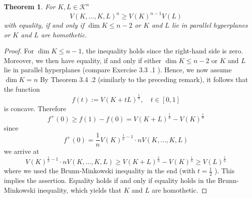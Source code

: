 \documentclass[oneside]{book}
\newtheorem{theorem}{Theorem}[section]
\begin{document}
 
\begin{theorem}
 
For $K, L \in \mathcal{K}^{n}$
\[
V(K, \ldots, K, L)^{n} \geq V(K)^{n-1} V(L)
\]
with equality, if and only if $\operatorname{dim} K \leq n-2$ or $K$ and $L$ lie in parallel hyperplanes or $K$ and $L$ are homothetic.
\end{theorem} 
\begin{proof}
    

 For $\operatorname{dim} K \leq n-1$, the inequality holds since the right-hand side is zero. Moreover, we then have equality, if and only if either $\operatorname{dim} K \leq n-2$ or $K$ and $L$ lie in parallel hyperplanes (compare Exercise 3.3 .1 ). Hence, we now assume $\operatorname{dim} K=n$ By Theorem 3.4 .2 (similarly to the preceding remark), it follows that the function
\[
f(t):=V(K+t L)^{\frac{1}{n}}, \quad t \in[0,1]
\]
is concave. Therefore
\[
f^{+}(0) \geq f(1)-f(0)=V(K+L)^{\frac{1}{n}}-V(K)^{\frac{1}{n}}
\]
since
\[
f^{+}(0)=\frac{1}{n} V(K)^{\frac{1}{n}-1} \cdot n V(K, \ldots, K, L)
\]
we arrive at
\[
V(K)^{\frac{1}{n}-1} \cdot n V(K, \ldots, K, L) \geq V(K+L)^{\frac{1}{n}}-V(K)^{\frac{1}{n}} \geq V(L)^{\frac{1}{n}}
\]
where we used the Brunn-Minkowski inequality in the end (with $t=\frac{1}{2}$ ). This implies the assertion. Equality holds if and only if equality holds in the Brunn-Minkowski inequality, which yields that $K$ and $L$ are homothetic.      
 \end{proof}     
 
 
 
 
 
 
 
\end{document}
